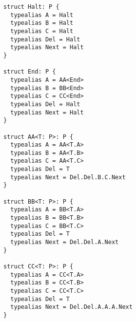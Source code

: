 \documentclass[../generics]{subfiles}
\begin{document}
\begin{listing}\label{collatz listing}
\begin{Verbatim}[fontsize=\small]
struct Halt: P {
  typealias A = Halt
  typealias B = Halt
  typealias C = Halt
  typealias Del = Halt
  typealias Next = Halt
}

struct End: P {
  typealias A = AA<End>
  typealias B = BB<End>
  typealias C = CC<End>
  typealias Del = Halt
  typealias Next = Halt
}

struct AA<T: P>: P {
  typealias A = AA<T.A>
  typealias B = AA<T.B>
  typealias C = AA<T.C>
  typealias Del = T
  typealias Next = Del.Del.B.C.Next
}

struct BB<T: P>: P {
  typealias A = BB<T.A>
  typealias B = BB<T.B>
  typealias C = BB<T.C>
  typealias Del = T
  typealias Next = Del.Del.A.Next
}

struct CC<T: P>: P {
  typealias A = CC<T.A>
  typealias B = CC<T.B>
  typealias C = CC<T.C>
  typealias Del = T
  typealias Next = Del.Del.A.A.A.Next
}
\end{Verbatim}
\end{listing}

\newcommand{\SigmaA}{\Sigma_{\texttt{A}}}
\newcommand{\SigmaB}{\Sigma_{\texttt{B}}}
\newcommand{\SigmaC}{\Sigma_{\texttt{C}}}
\newcommand{\SigmaAA}{\Sigma_{\texttt{AA}}}
\newcommand{\SigmaBB}{\Sigma_{\texttt{BB}}}
\newcommand{\SigmaCC}{\Sigma_{\texttt{CC}}}
\newcommand{\SigmaEnd}{\Sigma_{\texttt{End}}}
\newcommand{\SigmaHalt}{\Sigma_{\texttt{Halt}}}
\newcommand{\SigmaDel}{\Sigma_{\texttt{Del}}}
\newcommand{\TNext}{\texttt{$\uptau$.[P]Next}}

\newcommand{\ConfAAP}{\ConfReq{AA<$\uptau$>}{P}}
\newcommand{\ConfBBP}{\ConfReq{BB<$\uptau$>}{P}}
\newcommand{\ConfCCP}{\ConfReq{CC<$\uptau$>}{P}}
\newcommand{\ConfEndP}{\ConfReq{End}{P}}
\newcommand{\ConfHaltP}{\ConfReq{Halt}{P}}

\newcommand{\ConfTP}{\ConfReq{$\uptau$}{P}}

\newcommand{\AssocConfAP}{\AssocConf{Self.[P]A}{P}}
\newcommand{\AssocConfBP}{\AssocConf{Self.[P]B}{P}}
\newcommand{\AssocConfCP}{\AssocConf{Self.[P]C}{P}}
\newcommand{\AssocConfTP}{\AssocConf{Self.[P]T}{P}}
\end{document}

